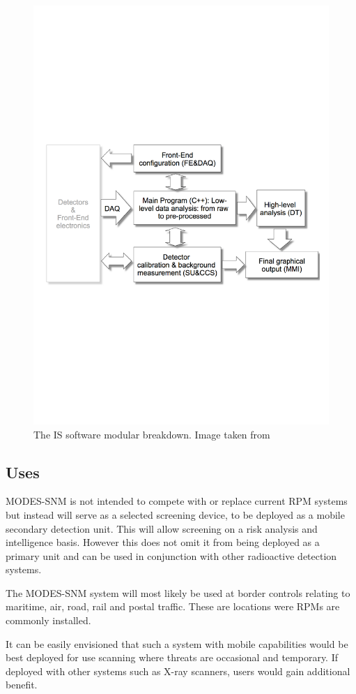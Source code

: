 \begin{figure}[htbp]
\begin{center}
\includegraphics[width=120mm]{Chapter5/figures/IS_softwareStructure.pdf}
\caption{The IS software modular breakdown. Image taken from \cite{modesInternal}}
\label{fig:modesISSoftware}
\end{center}
\end{figure}

\subsection{Uses}
MODES-SNM is not intended to compete with or replace current RPM systems but instead will serve as a selected screening device, to be deployed as a mobile secondary detection unit. This will allow screening on a risk analysis and intelligence basis. However this does not omit it from being deployed as a primary unit and can be used in conjunction with other radioactive detection systems.

The MODES-SNM system will most likely be used at border controls relating to maritime, air, road, rail and postal traffic. These are locations were RPMs are commonly installed. 

It can be easily envisioned that such a system with mobile capabilities would be best deployed for use scanning where threats are occasional and temporary. If deployed with other systems such as X-ray scanners, users would gain additional benefit.

